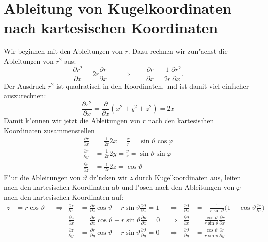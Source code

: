 \section{Ableitung von Kugelkoordinaten nach kartesischen Koordinaten}
Wir beginnen mit den Ableitungen von $r$. Dazu rechnen wir zun"achst die
Ableitungen von $r^2$ aus:
\[
\frac{\partial r^2}{\partial x}
=
2r\frac{\partial r}{\partial x}
\qquad
\Rightarrow
\qquad
\frac{\partial r}{\partial x}
=
\frac1{2r}\frac{\partial r^2}{\partial x}.
\]
Der Ausdruck  $r^2$ ist quadratisch in den Koordinaten, und ist damit
viel einfacher auszurechnen:
\[
\frac{\partial r^2}{\partial x}=\frac{\partial}{\partial x}(x^2+y^2+z^2)=2x
\]
Damit k"onnen wir jetzt die Ableitungen von $r$ nach den kartesischen
Koordinaten zusammenstellen
\begin{equation}
\begin{aligned}
\frac{\partial r}{\partial x}
&=
\frac1{2r}2x=\frac{x}{r}=\sin\vartheta\cos\varphi
\\
\frac{\partial r}{\partial y}
&=
\frac1{2r}2y=\frac{y}{r}=\sin\vartheta\sin\varphi
\\
\frac{\partial r}{\partial z}
&=
\frac1{2r}2z=\cos\vartheta
\end{aligned}
\label{skript:ableitungenvonr}
\end{equation}
F"ur die Ableitungen von $\vartheta$ dr"ucken wir $z$ durch Kugelkoordinaten
aus, leiten nach den kartesischen Koordinaten ab und l"osen nach den
Ableitungen von $\varphi$ nach den kartesischen Koordinaten auf:
\begin{align*}
z&=r\cos\vartheta
&&\Rightarrow&
\frac{\partial z}{\partial z}
&=
\frac{\partial r}{\partial z}\cos\vartheta
-
r \sin\vartheta\frac{\partial \vartheta}{\partial z}
=1
&&\Rightarrow&
\frac{\partial\vartheta}{\partial z}
&=
-\frac1{r\sin\vartheta}
\biggl(1-\cos\vartheta\frac{\partial r}{\partial z}\biggr)
\\
&&&&
\frac{\partial z}{\partial x}
&=
\frac{\partial r}{\partial x}\cos\vartheta
	- r\sin\vartheta\frac{\partial\vartheta}{\partial x}
=0
&&\Rightarrow&
\frac{\partial\vartheta}{\partial x}
&=
\frac{\cos\vartheta}{r\sin\vartheta}\frac{\partial r}{\partial x}
\\
&&&&
\frac{\partial z}{\partial y}
&=
\frac{\partial r}{\partial y}\cos\vartheta
	- r\sin\vartheta\frac{\partial\vartheta}{\partial y}
=0
&&\Rightarrow&
\frac{\partial\vartheta}{\partial y}
&=
\frac{\cos\vartheta}{r\sin\vartheta}\frac{\partial r}{\partial y}
\end{align*}

